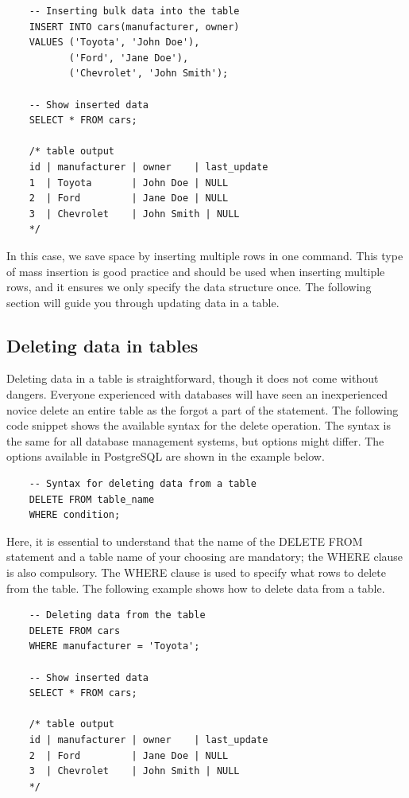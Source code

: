 \begin{verbatim}
    -- Inserting bulk data into the table
    INSERT INTO cars(manufacturer, owner)
    VALUES ('Toyota', 'John Doe'),
           ('Ford', 'Jane Doe'),
           ('Chevrolet', 'John Smith');

    -- Show inserted data
    SELECT * FROM cars;

    /* table output
    id | manufacturer | owner    | last_update
    1  | Toyota       | John Doe | NULL
    2  | Ford         | Jane Doe | NULL
    3  | Chevrolet    | John Smith | NULL
    */
\end{verbatim}

In this case, we save space by inserting multiple rows in one command. This type of mass insertion is good practice and should be used when inserting multiple rows, and it ensures we only specify the data structure once. The following section will guide you through updating data in a table.

\subsection{Deleting data in tables}
Deleting data in a table is straightforward, though it does not come without dangers. Everyone experienced with databases will have seen an inexperienced novice delete an entire table as the forgot a part of the statement. The following code snippet shows the available syntax for the delete operation. The syntax is the same for all database management systems, but options might differ. The options available in PostgreSQL are shown in the example below.

\begin{verbatim}
    -- Syntax for deleting data from a table
    DELETE FROM table_name
    WHERE condition;
\end{verbatim}

Here, it is essential to understand that the name of the DELETE FROM statement and a table name of your choosing are mandatory; the WHERE clause is also compulsory. The WHERE clause is used to specify what rows to delete from the table. The following example shows how to delete data from a table.

\begin{verbatim}
    -- Deleting data from the table
    DELETE FROM cars
    WHERE manufacturer = 'Toyota';

    -- Show inserted data
    SELECT * FROM cars;

    /* table output
    id | manufacturer | owner    | last_update
    2  | Ford         | Jane Doe | NULL
    3  | Chevrolet    | John Smith | NULL
    */
\end{verbatim}

